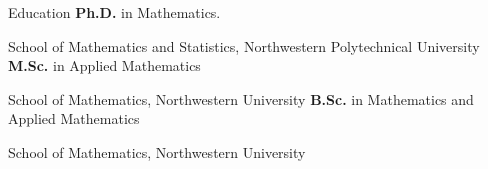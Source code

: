 \begin{rubric}{Education}
\entry*[2022 -- 2026]%
	\textbf{Ph.D. } in Mathematics.
		\par School of Mathematics and Statistics, Northwestern Polytechnical University
\entry*[2019 -- 2022]%
	\textbf{M.Sc.} in Applied Mathematics
		\par School of Mathematics, Northwestern University
\entry*[2015 -- 2019]%
	\textbf{B.Sc.} in Mathematics and Applied Mathematics
		\par School of Mathematics, Northwestern University
	
\end{rubric}